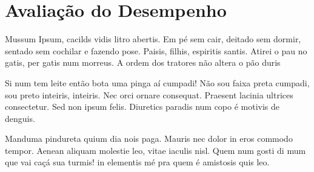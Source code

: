\section{Avaliação do Desempenho}

Mussum Ipsum, cacilds vidis litro abertis. Em pé sem cair, deitado sem dormir, sentado sem cochilar e fazendo pose. Paisis, filhis, espiritis santis. Atirei o pau no gatis, per gatis num morreus. A ordem dos tratores não altera o pão duris

Si num tem leite então bota uma pinga aí cumpadi! Não sou faixa preta cumpadi, sou preto inteiris, inteiris. Nec orci ornare consequat. Praesent lacinia ultrices consectetur. Sed non ipsum felis. Diuretics paradis num copo é motivis de denguis.

Manduma pindureta quium dia nois paga. Mauris nec dolor in eros commodo tempor. Aenean aliquam molestie leo, vitae iaculis nisl. Quem num gosti di mum que vai caçá sua turmis! in elementis mé pra quem é amistosis quis leo.